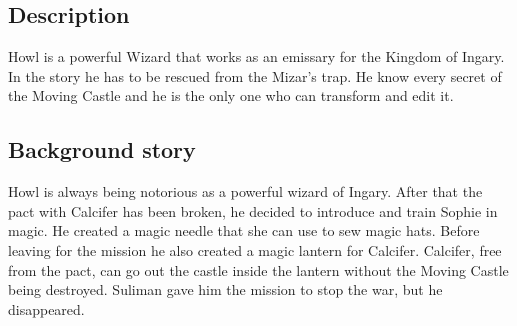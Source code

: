 \begin{figure}
\centering
\end{figure}

\subsection{Description}
Howl is a powerful Wizard that works as an emissary for the Kingdom of Ingary. In the story he has to be rescued from the Mizar’s trap. He know every secret of the Moving Castle and he is the only one who can transform and edit it.

\subsection{Background story}
Howl is always being notorious as a powerful wizard of Ingary. After that the pact with Calcifer has been broken, he decided to introduce and train Sophie in magic. He created a magic needle that she can use to sew magic hats. Before leaving for the mission he also created a magic lantern for Calcifer. Calcifer, free from the pact, can go out the castle inside the lantern without the Moving Castle being destroyed. Suliman gave him the mission to stop the war, but he disappeared.



